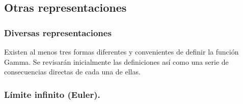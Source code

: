 \documentclass[12pt]{beamer}
\begin{document}
\subsection*{Otras representaciones} \label{seccion:otras_respresentaciones}

\begin{frame}
\frametitle{Diversas representaciones}
Existen al menos tres formas diferentes y convenientes de definir la función Gamma. Se revisarán inicialmente las definiciones así como una serie de consecuencias directas de cada una de ellas.
\end{frame}

\subsubsection{Límite infinito (Euler).}
\end{document}
